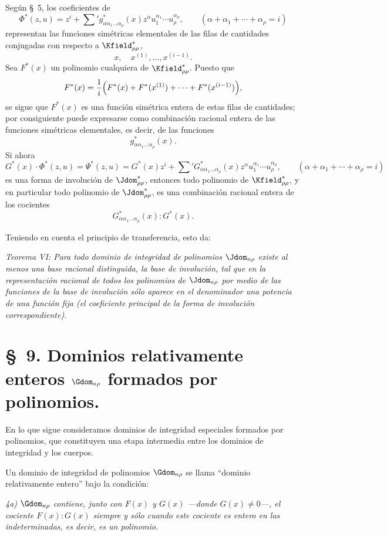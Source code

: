 \documentclass[11pt]{article}
\begin{document}
Según \S\ 5, los coeficientes de
\[
  \Phi^*(z,u)=z^i+\sum{}' g^*_{\alpha\alpha_1\ldots\alpha_\rho}(x)
  z^\alpha u_1^{\alpha_1}\cdots u_\rho^{\alpha_\rho},
  \qquad
  (\alpha+\alpha_1+\cdots+\alpha_\rho=i)
\]
representan las funciones simétricas elementales de las filas de cantidades conjugadas con respecto a $\Kfield^*_{\rho\rho}$,
\[
  x,\quad x^{(1)},\ldots,x^{(i-1)}.
\]
Sea $F^*(x)$ un polinomio cualquiera de $\Kfield^*_{\rho\rho}$. Puesto que
\[
  F^*(x)=\frac1i\Bigl(F^*(x)+F^*(x^{(1)})+
  \cdots+F^*(x^{(i-1)})\Bigr),
\]
se sigue que $F^*(x)$ es una función simétrica entera de estas filas de cantidades; por consiguiente puede expresarse como combinación racional entera de las funciones simétricas elementales, es decir, de las funciones
\[
  g^*_{\alpha\alpha_1\ldots\alpha_\rho}(x).
\]
Si ahora
\[
  G^*(x)\cdot\Phi^*(z,u)=\Psi^*(z,u)
  =G^*(x)z^i+
  \sum{}'G^*_{\alpha\alpha_1\ldots\alpha_\rho}(x)
  z^\alpha u_1^{\alpha_1}\cdots u_\rho^{\alpha_\rho},
  \qquad
  (\alpha+\alpha_1+\cdots+\alpha_\rho=i)
\]
es una forma de involución de $\Jdom^*_{\rho\rho}$, entonces todo polinomio de $\Kfield^*_{\rho\rho}$, y en particular todo polinomio de $\Jdom^*_{\rho\rho}$, es una combinación racional entera de los cocientes
\[
  G^*_{\alpha\alpha_1\ldots\alpha_\rho}(x):G^*(x).
\]

Teniendo en cuenta el principio de transferencia, esto da:

\emph{Teorema VI: Para todo dominio de integridad de polinomios $\Jdom_{n\rho}$ existe al menos una base racional distinguida, la base de involución, tal que en la representación racional de todos los polinomios de $\Jdom_{n\rho}$ por medio de las funciones de la base de involución sólo aparece en el denominador una potencia de una función fija (el coeficiente principal de la forma de involución correspondiente).}

\section*{\S\ 9. Dominios relativamente enteros $\Gdom_{n\rho}$ formados por polinomios.}

En lo que sigue consideramos dominios de integridad especiales formados por polinomios, que constituyen una etapa intermedia entre los dominios de integridad y los cuerpos.

Un dominio de integridad de polinomios $\Gdom_{n\rho}$ se llama ``dominio relativamente entero'' bajo la condición:

\emph{4a) $\Gdom_{n\rho}$ contiene, junto con $F(x)$ y $G(x)$ ---donde $G(x)\ne0$---, el cociente $F(x):G(x)$ siempre y sólo cuando este cociente es entero en las indeterminadas, es decir, es un polinomio.}
\end{document}

